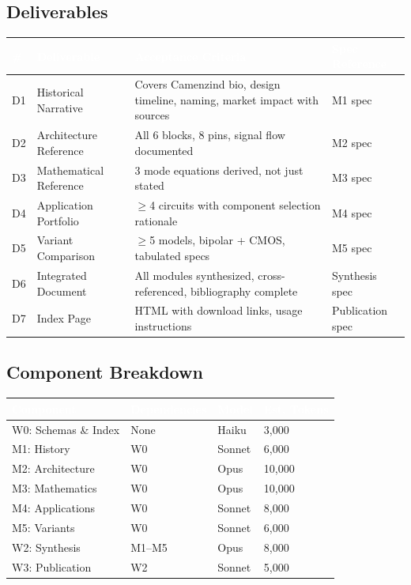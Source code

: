 \documentclass[11pt,letterpaper]{article}
\newcommand{\tableheader}[1]{\textbf{\sffamily\textcolor{white}{#1}}}
\begin{document}
\subsection{Deliverables}

\begin{center}
\begin{tabularx}{\textwidth}{C{0.5cm}L{3.5cm}XL{3cm}}
\toprule
{}
\tableheader{\#} & \tableheader{Deliverable} & \tableheader{Acceptance Criteria} & \tableheader{Spec Reference} \\
\midrule
D1 & Historical Narrative & Covers Camenzind bio, design timeline, naming, market impact with sources & M1 spec \\
D2 & Architecture Reference & All 6 blocks, 8 pins, signal flow documented & M2 spec \\
D3 & Mathematical Reference & 3 mode equations derived, not just stated & M3 spec \\
D4 & Application Portfolio & $\geq$4 circuits with component selection rationale & M4 spec \\
D5 & Variant Comparison & $\geq$5 models, bipolar + CMOS, tabulated specs & M5 spec \\
D6 & Integrated Document & All modules synthesized, cross-referenced, bibliography complete & Synthesis spec \\
D7 & Index Page & HTML with download links, usage instructions & Publication spec \\
\bottomrule
\end{tabularx}
\end{center}

\subsection{Component Breakdown}

\begin{center}
\begin{tabularx}{\textwidth}{L{3.5cm}L{2.5cm}C{1.5cm}C{2cm}}
\toprule
{}
\tableheader{Component} & \tableheader{Dependencies} & \tableheader{Model} & \tableheader{Est. Tokens} \\
\midrule
W0: Schemas \& Index & None & Haiku & 3,000 \\
M1: History & W0 & Sonnet & 6,000 \\
M2: Architecture & W0 & Opus & 10,000 \\
M3: Mathematics & W0 & Opus & 10,000 \\
M4: Applications & W0 & Sonnet & 8,000 \\
M5: Variants & W0 & Sonnet & 6,000 \\
W2: Synthesis & M1--M5 & Opus & 8,000 \\
W3: Publication & W2 & Sonnet & 5,000 \\
\bottomrule
\end{tabularx}
\end{center}
\end{document}
